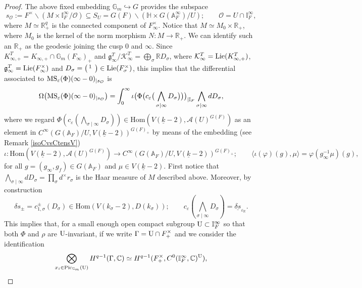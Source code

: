\documentclass{amsart}
\theoremstyle{definition}
\theoremstyle{remark}
\numberwithin{equation}{section}
\newcommand{\Pic}{\mathrm{Pic}}
\newcommand{\A}{{\mathbb A}}
\newcommand{\C}{{\mathbb C}}
\newcommand{\R}{{\mathbb R}}
\newcommand{\G}{{\mathbb G}}
\newcommand{\I}{{\mathbb I}}
\newcommand{\cA}{{\mathcal A}}
\newcommand{\cK}{{\mathcal K}}
\newcommand{\cO}{{\mathcal O}}
\newcommand{\Hom}{{\mathrm {Hom}}}
\begin{document}
\begin{proof}
The above fixed embedding $\G_m\hookrightarrow G$ provides the subspace
\[
s_\cO:=F^\times\backslash (M\times \I_F^\infty/\cO)\subseteq S_U=G(F)\backslash (\mathbb{H}\times G(\A_F^\infty)/U);\qquad \cO=U\cap\I_F^\infty,
\]
where $M\simeq \R_+^{q}$ is the connected component of $F_\infty^\times$. Notice that $M\simeq M_0\times \R_+$, where $M_0$ is the kernel of the norm morphism $N:M\rightarrow\R_+$. We can identify such an $\R_+$ as the geodesic joining the cusp $0$ and $\infty$. Since $K^T_{\infty,+}=K_{\infty,+}\cap\G_m(F_\infty)_+$ and $\mathfrak{g}^T_\infty/\cK^T_\infty=\bigoplus_\sigma \R D_\sigma$, where $\cK^T_\infty={\rm Lie}(K^T_{\infty,+})$, $\mathfrak{g}^T_\infty={\rm Lie}(F_\infty^\times)$ and $D_\sigma=\big(\begin{smallmatrix}
    1&\\&
\end{smallmatrix}\big)\in {\rm Lie}(F_\sigma^\times)$,
this implies that the differential associated to ${\rm MS}_\varepsilon(\Phi)(\infty-0)_{\mid s_\cO}$ is
\[
\Omega\big({\rm MS}_\varepsilon(\Phi)(\infty-0)_{\mid s_\cO}\big)=\int_0^\infty \iota\big(\Phi\big( c_\varepsilon\big(\bigwedge_{\sigma\mid\infty} D_\sigma\big)\big)\big)_{\mid \I_F}\bigwedge_{\sigma\mid\infty} dD_\sigma,
\]
where we regard $\Phi\left( c_\varepsilon\left(\bigwedge_{\sigma\mid\infty} D_\sigma\right)\right)\in \Hom(V(\underline k-2),\cA(U)^{G(F)})$ as an element in $C^\infty(G(\A_F)/U,V(\underline k-2))^{G(F)_+}$ by means of the embedding (see Remark \ref{isoCvsCtensV})
\[
\iota:\Hom(V(\underline k-2),\cA(U)^{G(F)})\longrightarrow C^\infty(G(\A_F)/U,V(\underline k-2))^{G(F)_+};\qquad\langle\iota(\varphi)(g),\mu\rangle=\varphi(g_\infty^{-1}\mu)(g),
\]
for all $g=(g_\infty,g_f)\in G(\A_F)$ and $\mu\in V(\underline k-2)$.
First notice that $\bigwedge_{\sigma\mid\infty} dD_\sigma=\prod_\sigma d^\times r_\sigma$ is the Haar measure of $M$ described above. Moreover, by construction 
\[
\delta s_\pm=c_{1,\sigma}^\pm(D_\sigma)\in \Hom(V(k_\sigma-2),D(k_\sigma));\qquad c_\varepsilon\left(\bigwedge_{\sigma\mid\infty} D_\sigma\right)=\underline{\delta s}_{\varepsilon_\R}.
\]
This implies that, for a small enough open compact subgroup ${\rm U}\subset \I_F^\infty$ so that both $\Phi$ and $\rho$ are ${\rm U}$-invariant, if we write $\Gamma={\rm U}\cap F_+^\times$ and we consider the identification
\[
\bigotimes_{x_i\in \Pic_{\G_m}({\rm U})}H^{q-1}(\Gamma,\C)\simeq H^{q-1}(F_+^\times,C^0(\I_F^\infty,\C)^{\rm U}), 
\]
\end{proof}
\end{document}
